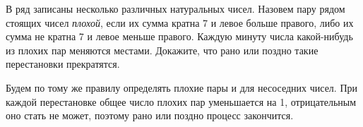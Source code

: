 \problem{}
В ряд записаны несколько различных натуральных чисел.
Назовем пару рядом стоящих чисел \emph{плохой}, если их сумма кратна 7 и левое
больше правого, либо их сумма не кратна 7 и левое меньше правого.
Каждую минуту числа какой-нибудь из плохих пар меняются местами.
Докажите, что рано или поздно такие перестановки прекратятся.

\solution
Будем по тому же правилу определять плохие пары и для несоседних чисел.
При каждой перестановке общее число плохих пар уменьшается на 1, отрицательным
оно стать не может, поэтому рано или поздно процесс закончится.

\endproblem
